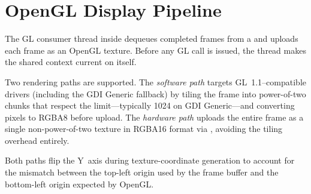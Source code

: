 \section{OpenGL Display Pipeline}
\label{subsec:opengl-display}

The GL consumer thread inside  dequeues completed
frames from a  and uploads each frame as an
OpenGL texture.  Before any GL call is issued, the thread makes the
shared context current on itself.

Two rendering paths are supported.  The \emph{software path} targets
GL~1.1--compatible drivers (including the GDI Generic fallback) by tiling
the frame into power-of-two chunks that respect the
 limit---typically 1024 on GDI Generic---and
converting  pixels to RGBA8 before upload.  The
\emph{hardware path} uploads the entire frame as a single
non-power-of-two texture in RGBA16 format via ,
avoiding the tiling overhead entirely.

Both paths flip the Y~axis during texture-coordinate generation to
account for the mismatch between the top-left origin used by the
frame buffer and the bottom-left origin expected by OpenGL.
